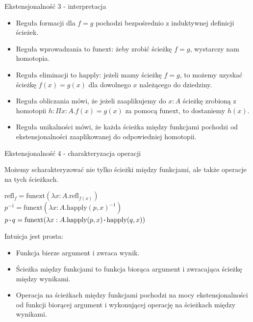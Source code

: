 \documentclass{beamer}
\newcommand{\refl}[1]{\text{refl}_{#1}}
\newcommand{\inv}[1]{#1^{-1}}
\newcommand{\sq}{\mathbin{\vcenter{\hbox{\rule{.3ex}{.3ex}}}}}
\newcommand{\happly}{\text{happly}}
\newcommand{\funext}{\text{funext}}
\begin{document}
\begin{frame}{Ekstensjonalność 3 - interpretacja}
\begin{itemize}
	\item Reguła formacji dla $f = g$ pochodzi bezpośrednio z induktywnej definicji ścieżek.
	\item Reguła wprowadzania to $\funext$: żeby zrobić ścieżkę $f = g$, wystarczy nam homotopia.
	\item Reguła eliminacji to $\happly$: jeżeli mamy ścieżkę $f = g$, to możemy uzyskać ścieżkę $f(x) = g(x)$ dla dowolnego $x$ należącego do dziedziny.
	\item Reguła obliczania mówi, że jeżeli zaaplikujemy do $x : A$ ścieżkę zrobioną z homotopii $h : \Pi x : A. f(x) = g(x)$ za pomocą $\funext$, to dostaniemy $h(x)$.
	\item Reguła unikalności mówi, że każda ścieżka między funkcjami pochodzi od ekstensjonalności zaaplikowanej do odpowiedniej homotopii.
\end{itemize}
\end{frame}

\begin{frame}{Ekstensjonalność 4 - charakteryzacja operacji}

Możemy scharakteryzować nie tylko ścieżki między funkcjami, ale także operacje na tych ścieżkach.

\begin{theorem}
$\refl{f} = \funext(\lambda x : A. \refl{f(x)})$ \\

$\inv{p} = \funext(\lambda x : A.\inv{\happly(p, x)})$ \\

$p \sq q = \funext(\lambda x : A. \happly(p, x) \sq \happly(q, x))$
\end{theorem}

Intuicja jest prosta:
\begin{itemize}
	\item Funkcja bierze argument i zwraca wynik.
	\item Ścieżka między funkcjami to funkcja biorąca argument i zwracająca ścieżkę między wynikami.
	\item Operacja na ścieżkach między funkcjami pochodzi na mocy ekstensjonalności od funkcji biorącej argument i wykonującej operację na ścieżkach między wynikami.
\end{itemize}

\end{frame}
\end{document}
